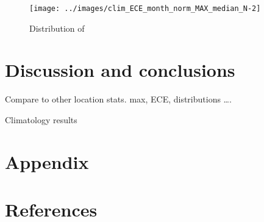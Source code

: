 \documentclass[
]{article}
\begin{document}
\begin{figure}[h!]

{\centering \texttt{[image: ../images/clim\_ECE\_month\_norm\_MAX\_median\_N-2]} 

}

\caption{Distribution of }\label{fig:unnamed-chunk-6}
\end{figure}

\FloatBarrier

\hypertarget{discussion-and-conclusions}{%
\section{Discussion and conclusions}\label{discussion-and-conclusions}}

Compare to other location stats.
max, ECE, distributions \ldots.

Climatology results

\hypertarget{appendix}{%
\section*{Appendix}\label{appendix}}

\hypertarget{references}{%
\section*{References}\label{references}}
\end{document}

